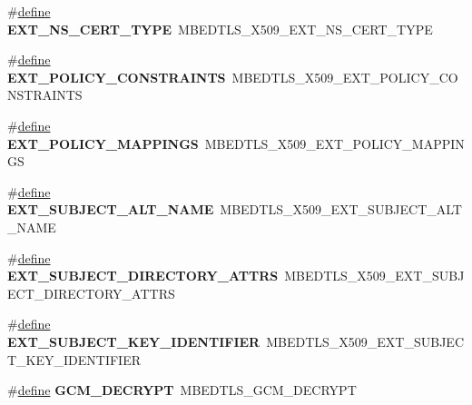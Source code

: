 \begin{DoxyCompactItemize}
\item 
\mbox{\label{compat-1_83_8h_ab82dcddf27656a1bc2efacc9589838db}} 
\#\hyperlink{structdefine}{define} {\bfseries E\+X\+T\+\_\+\+N\+S\+\_\+\+C\+E\+R\+T\+\_\+\+T\+Y\+PE}~M\+B\+E\+D\+T\+L\+S\+\_\+\+X509\+\_\+\+E\+X\+T\+\_\+\+N\+S\+\_\+\+C\+E\+R\+T\+\_\+\+T\+Y\+PE
\item 
\mbox{\label{compat-1_83_8h_a24e47a2fb35635684cc6e33c1543faa0}} 
\#\hyperlink{structdefine}{define} {\bfseries E\+X\+T\+\_\+\+P\+O\+L\+I\+C\+Y\+\_\+\+C\+O\+N\+S\+T\+R\+A\+I\+N\+TS}~M\+B\+E\+D\+T\+L\+S\+\_\+\+X509\+\_\+\+E\+X\+T\+\_\+\+P\+O\+L\+I\+C\+Y\+\_\+\+C\+O\+N\+S\+T\+R\+A\+I\+N\+TS
\item 
\mbox{\label{compat-1_83_8h_ad264a8f9ed49bc0a40cf21ee7213216e}} 
\#\hyperlink{structdefine}{define} {\bfseries E\+X\+T\+\_\+\+P\+O\+L\+I\+C\+Y\+\_\+\+M\+A\+P\+P\+I\+N\+GS}~M\+B\+E\+D\+T\+L\+S\+\_\+\+X509\+\_\+\+E\+X\+T\+\_\+\+P\+O\+L\+I\+C\+Y\+\_\+\+M\+A\+P\+P\+I\+N\+GS
\item 
\mbox{\label{compat-1_83_8h_aa86a67d1a8363fd5bbdaba523163a269}} 
\#\hyperlink{structdefine}{define} {\bfseries E\+X\+T\+\_\+\+S\+U\+B\+J\+E\+C\+T\+\_\+\+A\+L\+T\+\_\+\+N\+A\+ME}~M\+B\+E\+D\+T\+L\+S\+\_\+\+X509\+\_\+\+E\+X\+T\+\_\+\+S\+U\+B\+J\+E\+C\+T\+\_\+\+A\+L\+T\+\_\+\+N\+A\+ME
\item 
\mbox{\label{compat-1_83_8h_a6513410277596ad6cfdaafe753e9002f}} 
\#\hyperlink{structdefine}{define} {\bfseries E\+X\+T\+\_\+\+S\+U\+B\+J\+E\+C\+T\+\_\+\+D\+I\+R\+E\+C\+T\+O\+R\+Y\+\_\+\+A\+T\+T\+RS}~M\+B\+E\+D\+T\+L\+S\+\_\+\+X509\+\_\+\+E\+X\+T\+\_\+\+S\+U\+B\+J\+E\+C\+T\+\_\+\+D\+I\+R\+E\+C\+T\+O\+R\+Y\+\_\+\+A\+T\+T\+RS
\item 
\mbox{\label{compat-1_83_8h_af918b482ca119bfc67935caa07d3e248}} 
\#\hyperlink{structdefine}{define} {\bfseries E\+X\+T\+\_\+\+S\+U\+B\+J\+E\+C\+T\+\_\+\+K\+E\+Y\+\_\+\+I\+D\+E\+N\+T\+I\+F\+I\+ER}~M\+B\+E\+D\+T\+L\+S\+\_\+\+X509\+\_\+\+E\+X\+T\+\_\+\+S\+U\+B\+J\+E\+C\+T\+\_\+\+K\+E\+Y\+\_\+\+I\+D\+E\+N\+T\+I\+F\+I\+ER
\item 
\mbox{\label{compat-1_83_8h_a65cecb8f0fb02b51814bfbbae65fdd9c}} 
\#\hyperlink{structdefine}{define} {\bfseries G\+C\+M\+\_\+\+D\+E\+C\+R\+Y\+PT}~M\+B\+E\+D\+T\+L\+S\+\_\+\+G\+C\+M\+\_\+\+D\+E\+C\+R\+Y\+PT

\end{DoxyCompactItemize}
